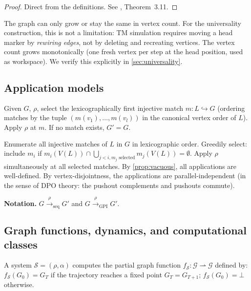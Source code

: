 \documentclass{../shared/primo}
\begin{document}
\begin{proof}
Direct from the definitions. See \cite{ehrig2006fundamentals}, Theorem~3.11.
\end{proof}

\begin{remark}
The graph can only grow or stay the same in vertex count. For the universality construction, this is not a limitation: TM simulation requires moving a head marker by \emph{rewiring edges}, not by deleting and recreating vertices. The vertex count grows monotonically (one fresh vertex per step at the head position, used as workspace). We verify this explicitly in \cref{sec:universality}.
\end{remark}

\subsection{Application models}

\begin{definition}
Given $G$, $\rho$, select the lexicographically first injective match $m: L \hookrightarrow G$ (ordering matches by the tuple $(m(v_1), \ldots, m(v_l))$ in the canonical vertex order of $L$). Apply $\rho$ at $m$. If no match exists, $G' = G$.
\end{definition}

\begin{definition}\label{def:gpi}
Enumerate all injective matches of $L$ in $G$ in lexicographic order. Greedily select: include $m_i$ if $m_i(V(L)) \cap \bigcup_{j < i, m_j \text{ selected}} m_j(V(L)) = \emptyset$. Apply $\rho$ simultaneously at all selected matches. By \cref{prop:vacuous}, all applications are well-defined. By vertex-disjointness, the applications are parallel-independent (in the sense of DPO theory: the pushout complements and pushouts commute).
\end{definition}

\textbf{Notation.} $G \xrightarrow{\rho}_{\text{seq}} G'$ and $G \xrightarrow{\rho}_{\text{GPI}} G'$.

\subsection{Graph functions, dynamics, and computational classes}

\begin{definition}
A system $\mathcal{S} = (\rho, \alpha)$ computes the partial graph function $f_{\mathcal{S}}: \mathcal{G} \rightharpoonup \mathcal{G}$ defined by: $f_{\mathcal{S}}(G_0) = G_T$ if the trajectory reaches a fixed point $G_T = G_{T+1}$; $f_{\mathcal{S}}(G_0) = \bot$ otherwise.
\end{definition}
\end{document}
